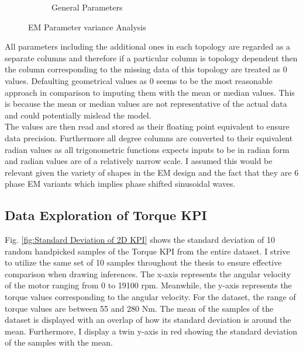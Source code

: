 \documentclass{report} %
\begin{document}
\begin{figure}[H]
\begin{subfigure}{0.32\textwidth}
        \caption{General Parameters}
        \label{subfig:General Parameters}
    \end{subfigure}
    \caption{\ac{EM} Parameter variance Analysis}
    \label{fig:EM Parameter variance Analysis}
\end{figure}

All parameters including the additional ones in each topology are regarded as a separate columns and therefore if a particular column is topology dependent then the 
column corresponding to the missing data of this topology are treated as 0 values. Defaulting geometrical values as 0 seems to be the most reasonable approach in comparison 
to imputing them with the mean or median values. This is because the mean or median values are not representative of the actual data and could potentially mislead the model.\\

The values are then read and stored as their floating point equivalent to ensure data precision.
Furthermore all degree columns are converted to their equivalent radian values as all trigonometric functions expects inputs to be in radian form and radian values are of
a relatively narrow scale. 
I assumed this would be relevant given the variety of shapes in the \ac{EM} design and the fact that they are 6 phase \ac{EM} variants which implies phase shifted 
sinusoidal waves.

\subsection{Data Exploration of Torque KPI}\label{subsec:Deep Dive into 2D KPI}
Fig. \ref{fig:Standard Deviation of 2D KPI} shows the standard deviation of 10 random handpicked samples of the Torque \ac{KPI} from the entire dataset.
I strive to utilize the same set of 10 samples throughout the thesis to ensure effective comparison when drawing inferences. 
The x-axis represents the angular velocity of the motor ranging from 0 to 19100 rpm. Meanwhile, the y-axis represents the torque values corresponding to the 
angular velocity. For the dataset, the range of torque values are between 55 and 280 Nm. 
The mean of the samples of the dataset is displayed with an overlap of how its standard deviation is around the mean.
Furthermore, I display a twin y-axis in red showing the standard deviation of the samples with the mean.\\
\end{document}
